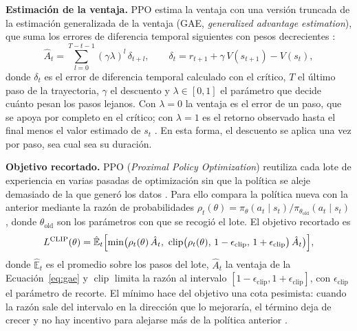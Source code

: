 \noindent\textbf{Estimación de la ventaja.} PPO estima la ventaja con una versión truncada de la
estimación generalizada de la ventaja (GAE, \textit{generalized advantage estimation}), que suma
los errores de diferencia temporal siguientes con pesos decrecientes \citep{Schulman2017_PPO}:
\begin{equation}
  \hat A_t = \sum_{l=0}^{T-t-1} (\gamma\lambda)^l\, \delta_{t+l}, \qquad
  \delta_t = r_{t+1} + \gamma\, V(s_{t+1}) - V(s_t),
  \label{eq:gae}
\end{equation}
donde $\delta_t$ es el error de diferencia temporal calculado con el crítico, $T$ el último paso
de la trayectoria, $\gamma$ el descuento y $\lambda \in [0,1]$ el parámetro que decide cuánto
pesan los pasos lejanos. Con $\lambda = 0$ la ventaja es el error de un paso, que se apoya por
completo en el crítico; con $\lambda = 1$ es el retorno observado hasta el final menos el valor
estimado de $s_t$ \citep{Schulman2017_PPO,SuttonBarto2018}. En esta forma, el descuento se aplica
una vez por paso, sea cual sea su duración.

\noindent\textbf{Objetivo recortado.} PPO (\textit{Proximal Policy Optimization}) reutiliza cada
lote de experiencia en varias pasadas de optimización sin que la política se aleje demasiado de la
que generó los datos \citep{Schulman2017_PPO}. Para ello compara la política nueva con la anterior
mediante la razón de probabilidades
$\rho_t(\theta) = \pi_\theta(a_t \mid s_t) / \pi_{\theta_{\text{old}}}(a_t \mid s_t)$, donde
$\theta_{\text{old}}$ son los parámetros con que se recogió el lote. El objetivo recortado es
\begin{equation}
  L^{\text{CLIP}}(\theta) = \hat{\mathbb{E}}_t\Bigl[\min\bigl(\rho_t(\theta)\, \hat A_t,\
  \operatorname{clip}\bigl(\rho_t(\theta),\, 1-\epsilon_{\text{clip}},\, 1+\epsilon_{\text{clip}}\bigr)\, \hat A_t\bigr)\Bigr],
  \label{eq:ppo-clip}
\end{equation}
donde $\hat{\mathbb{E}}_t$ es el promedio sobre los pasos del lote, $\hat A_t$ la ventaja de la
Ecuación~\ref{eq:gae} y $\operatorname{clip}$ limita la razón al intervalo
$[1-\epsilon_{\text{clip}}, 1+\epsilon_{\text{clip}}]$, con $\epsilon_{\text{clip}}$ el parámetro
de recorte. El mínimo hace del objetivo una cota pesimista: cuando la razón sale del intervalo en
la dirección que lo mejoraría, el término deja de crecer y no hay incentivo para alejarse más de
la política anterior \citep{Schulman2017_PPO}.

